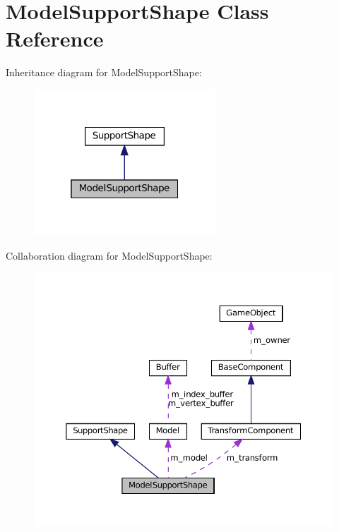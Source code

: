 \hypertarget{classModelSupportShape}{}\section{Model\+Support\+Shape Class Reference}
\label{classModelSupportShape}


Inheritance diagram for Model\+Support\+Shape\+:\nopagebreak
\begin{figure}[H]
\begin{center}
\leavevmode
\includegraphics[width=193pt]{classModelSupportShape__inherit__graph}
\end{center}
\end{figure}


Collaboration diagram for Model\+Support\+Shape\+:\nopagebreak
\begin{figure}[H]
\begin{center}
\leavevmode
\includegraphics[width=350pt]{classModelSupportShape__coll__graph}
\end{center}
\end{figure}
